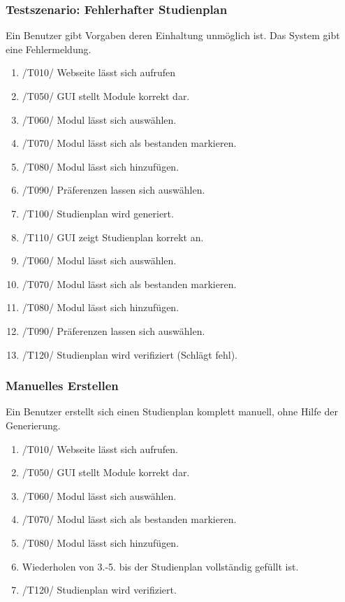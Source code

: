\documentclass[parskip=full]{scrartcl}
\begin{document}
		\subsubsection{Testszenario: Fehlerhafter Studienplan}

			Ein Benutzer gibt Vorgaben deren Einhaltung unmöglich ist. Das System gibt eine Fehlermeldung.

			\begin{enumerate}
				\item /T010/ Webseite lässt sich aufrufen
				\item /T050/ GUI stellt Module korrekt dar.
				\item /T060/ Modul lässt sich auswählen.
				\item /T070/ Modul lässt sich als bestanden markieren.
				\item /T080/ Modul lässt sich hinzufügen.
				\item /T090/ Präferenzen lassen sich auswählen.
				\item /T100/ Studienplan wird generiert.
				\item /T110/ GUI zeigt Studienplan korrekt an.
				\item /T060/ Modul lässt sich auswählen.
				\item /T070/ Modul lässt sich als bestanden markieren.
				\item /T080/ Modul lässt sich hinzufügen.
				\item /T090/ Präferenzen lassen sich auswählen.
				\item /T120/ Studienplan wird verifiziert (Schlägt fehl).
			\end{enumerate}
	 
		\subsubsection{Manuelles Erstellen} 
	
			Ein Benutzer erstellt sich einen Studienplan komplett manuell, ohne Hilfe der Generierung.
	
			\begin{enumerate}
				\item /T010/ Webseite lässt sich aufrufen.
				\item /T050/ GUI stellt Module korrekt dar.
				\item /T060/ Modul lässt sich auswählen.
				\item /T070/ Modul lässt sich als bestanden markieren.
				\item /T080/ Modul lässt sich hinzufügen.
				\item Wiederholen von 3.-5. bis der Studienplan vollständig gefüllt ist.
				\item /T120/ Studienplan wird verifiziert.
			\end{enumerate} 
\end{document}
